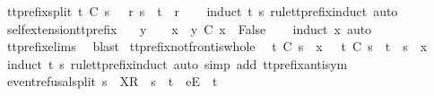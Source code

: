 \begin{isabellebody}
\endisatagproof
{\isafoldproof}%
%
\isadelimproof
\isanewline
%
\endisadelimproof
\isanewline
{}\isamarkupfalse%
\ tt{\isacharunderscore}prefix{\isacharunderscore}split{\isacharcolon}\ {\isachardoublequoteopen}t\ {\isasymle}\isactrlsub C\ s\ {\isasymLongrightarrow}\ {\isasymexists}\ r{\isachardot}\ s\ {\isacharequal}\ t\ {\isacharat}\ r{\isachardoublequoteclose}\isanewline
%
\isadelimproof
\ \ %
\endisadelimproof
%
\isatagproof
{}\isamarkupfalse%
\ {\isacharparenleft}induct\ t\ s\ rule{\isacharcolon}tt{\isacharunderscore}prefix{\isachardot}induct{\isacharcomma}\ auto{\isacharparenright}%
\endisatagproof
{\isafoldproof}%
%
\isadelimproof
\isanewline
%
\endisadelimproof
\isanewline
{}\isamarkupfalse%
\ self{\isacharunderscore}extension{\isacharunderscore}tt{\isacharunderscore}prefix{\isacharcolon}\ \isanewline
\ \ {\isachardoublequoteopen}y\ {\isasymnoteq}\ {\isacharbrackleft}{\isacharbrackright}\ {\isasymLongrightarrow}\ x\ {\isacharat}\ y\ {\isasymle}\isactrlsub C\ x\ {\isasymLongrightarrow}\ False{\isachardoublequoteclose}\isanewline
%
\isadelimproof
\ \ %
\endisadelimproof
%
\isatagproof
{}\isamarkupfalse%
\ {\isacharparenleft}induct\ x{\isacharcomma}\ auto{\isacharparenright}\isanewline
\ \ \isamarkupfalse%
\ tt{\isacharunderscore}prefix{\isachardot}elims{\isacharparenleft}{}{\isacharparenright}\ \isamarkupfalse%
\ blast%
\endisatagproof
{\isafoldproof}%
%
\isadelimproof
\isanewline
%
\endisadelimproof
\isanewline
{}\isamarkupfalse%
\ tt{\isacharunderscore}prefix{\isacharunderscore}notfront{\isacharunderscore}is{\isacharunderscore}whole{\isacharcolon}\isanewline
\ \ {\isachardoublequoteopen}t\ {\isasymle}\isactrlsub C\ s\ {\isacharat}\ {\isacharbrackleft}x{\isacharbrackright}\ {\isasymLongrightarrow}\ {\isasymnot}\ t\ {\isasymle}\isactrlsub C\ s\ {\isasymLongrightarrow}\ t\ {\isacharequal}\ s\ {\isacharat}\ {\isacharbrackleft}x{\isacharbrackright}{\isachardoublequoteclose}\isanewline
%
\isadelimproof
\ \ %
\endisadelimproof
%
\isatagproof
{}\isamarkupfalse%
\ {\isacharparenleft}induct\ t\ s\ rule{\isacharcolon}tt{\isacharunderscore}prefix{\isachardot}induct{\isacharcomma}\ auto\ simp\ add{\isacharcolon}\ tt{\isacharunderscore}prefix{\isacharunderscore}antisym{\isacharparenright}%
\endisatagproof
{\isafoldproof}%
%
\isadelimproof
\isanewline
%
\endisadelimproof
\isanewline
{}\isamarkupfalse%
\ event{\isacharunderscore}refusal{\isacharunderscore}split{\isacharcolon}\ {\isachardoublequoteopen}s{}\ {\isacharat}\ {\isacharbrackleft}X{\isacharbrackright}\isactrlsub R\ {\isacharhash}\ s{}\ {\isacharequal}\ t{}\ {\isacharat}\ {\isacharbrackleft}e{\isacharbrackright}\isactrlsub E\ {\isacharhash}\ t{}\ {\isasymLongrightarrow}\isanewline

\end{isabellebody}
